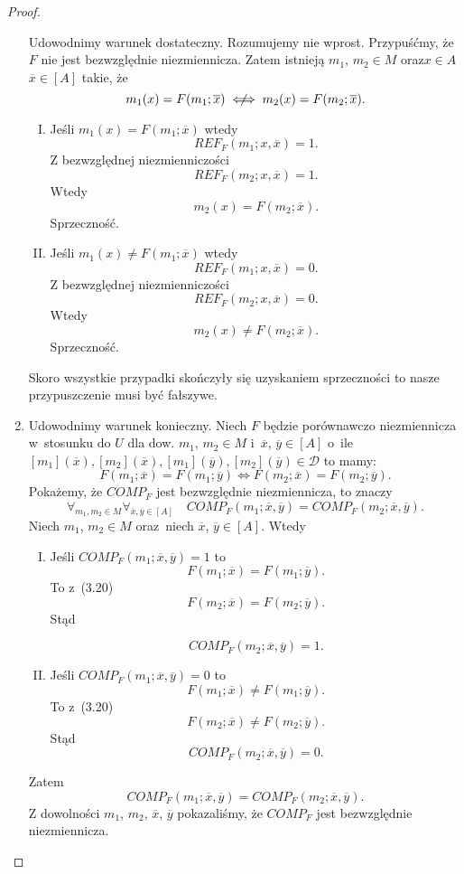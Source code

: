 \documentclass[12pt,a4paper]{report}
\newcommand{\domkniecie}[1]{\left[ {#1} \right] }
\newcommand{\notiff}{%
  \mathrel{{\ooalign{\hidewidth$\not\phantom{"}$\hidewidth\cr$\iff$}}}}
\begin{document}
\begin{proof}
\begin{enumerate}
Udowodnimy warunek dostateczny. Rozumujemy nie wprost. Przypuśćmy, że $F$ nie jest bezwzględnie niezmiennicza. Zatem istnieją $m_1$, $m_2 \in M$ oraz$x\in A$ $\overline{x} \in \domkniecie{A}$ takie, że
$$
m_{1}(x)=F(m_{1};\overline{x}) \notiff m_{2}(x)=F(m_{2};\overline{x}).
$$
\begin{enumerate}[I.]
\item
Jeśli $m_1(x)=F(m_1;\overline{x})$ wtedy 
$$
REF_{F}(m_1;x,\overline{x})=1.
$$
Z bezwzględnej niezmienniczości
 $$
 REF_{F}(m_2;x,\overline{x})=1.
 $$
Wtedy
$$
m_2(x)=F(m_2;\overline{x}).
$$
Sprzeczność.
\item
Jeśli $m_1(x)\ne F(m_1;\overline{x})$ wtedy 
$$
REF_{F}(m_1;x,\overline{x})=0.
$$
Z bezwzględnej niezmienniczości 
$$
REF_{F}(m_2;x,\overline{x})=0.
$$ 
Wtedy
$$
m_2(x)\ne F(m_2;\overline{x}).
$$
 Sprzeczność.
\end{enumerate}
Skoro wszystkie przypadki skończyły się uzyskaniem sprzeczności to nasze przypuszczenie musi być fałszywe.
\item 
Udowodnimy warunek konieczny. Niech $F$ będzie porównawczo niezmiennicza w~stosunku do $U$ 
dla dow. $m_1$, $m_2 \in M$ i~$\overline{x}$, $\overline{y} \in \domkniecie{A}$ o~ile $\domkniecie{m_1}(\overline{x}), \domkniecie{ m_2}(\overline{x}), \domkniecie{m_1}(\overline{y}), \domkniecie{m_2}(\overline{y}) \in \mathcal{D}$ to mamy:
\begin{equation}
F(m_{1};\overline{x})=F(m_{1};\overline{y}) \iff F(m_{2};\overline{x})=F(m_{2};\overline{y}).
\end{equation}
Pokażemy, że $COMP_{F}$ jest bezwzględnie niezmiennicza, to znaczy
\begin{equation}
\forall_{m_1, m_2 \in M} \forall_{\overline{x}, \overline{y}\in \domkniecie{A}} \quad COMP_{F}(m_1;\overline{x},\overline{y})=COMP_{F}(m_2;\overline{x},\overline{y}).
\end{equation}
 Niech $m_1$, $m_2 \in M$ oraz~niech $\overline{x}$, $\overline{y} \in \domkniecie{A}$. Wtedy
\begin{enumerate}[I.]
\item
Jeśli $COMP_{F}(m_1;\overline{x},\overline{y})=1$ to
$$
F(m_1;\overline{x})=F(m_1;\overline{y}).
$$
To z~(3.20) 
$$
F(m_2;\overline{x})=F(m_2;\overline{y}).
$$
Stąd 

$$
COMP_{F}(m_2;\overline{x},\overline{y})=1.
$$
\item
Jeśli $COMP_{F}(m_1;\overline{x},\overline{y})=0$ to 
$$
F(m_1;\overline{x})\ne F(m_1;\overline{y}).
$$
To z~(3.20) 
$$
F(m_2;\overline{x})\ne F(m_2;\overline{y}).
$$
Stąd 
$$
COMP_{F}(m_2;\overline{x},\overline{y})=0.
$$
\end{enumerate}
Zatem 
$$
COMP_{F}(m_1;\overline{x},\overline{y})=COMP_{F}(m_2;\overline{x},\overline{y}).
$$
Z dowolności $m_1$, $m_2$, $\overline{x}$, $\overline{y}$ pokazaliśmy, że $COMP_{F}$ jest bezwzględnie niezmiennicza.


\end{enumerate}
\end{proof}
\end{document}
